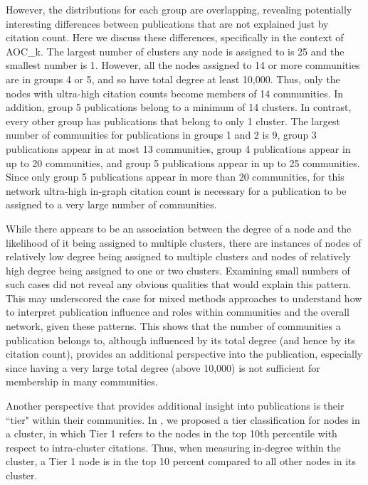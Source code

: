 \documentclass[12pt, oneside]{article}   	%
\begin{document}
	However, the distributions for each group are overlapping, revealing potentially interesting differences between publications that are not
	explained just by citation count. 
	Here we discuss these differences, specifically in the context of AOC\_k. 
	The largest number of clusters any node is assigned to is 25 and the smallest number is 1.
	However, all the nodes assigned to 14 or more communities are in groups 4 or 5, and so have total degree at least 10,000.
	Thus,  only the nodes with ultra-high citation counts become members of 14 communities.
	In addition, group 5 publications belong to a minimum of 14 clusters.  
	In contrast, every other group has publications that belong to only 1 cluster. 
	The largest number of communities for publications in groups 1 and 2 is  9,  
	group 3 publications appear in at most 13 communities, 
	group 4 publications appear in up to 20 communities, 
	and group 5 publications appear in up to 25 communities. 
	Since only group 5 publications appear in more than 20 communities, for this network ultra-high in-graph citation count is  necessary  for a publication to be assigned to a very large number of communities.  
	
	While there appears to be an association between the degree of a node and the likelihood of it being assigned to multiple clusters, there are instances of nodes of relatively low degree being assigned to multiple clusters and nodes of relatively high degree being assigned to one or two clusters. Examining small numbers of such cases did not reveal any obvious qualities that would explain this pattern. This may underscored the case for mixed methods approaches to understand how to interpret publication influence and roles within communities and the overall network, given these patterns. This shows that  the number of communities a publication belongs to, although influenced by its total degree (and hence by its citation count), provides an additional perspective into the publication, especially since having a very large total degree (above 10,000) is not sufficient  for membership in many communities. 
	
Another perspective that provides additional insight into publications is their ``tier" within their communities. In \cite{Chandrasekharan2021}, we  proposed a tier classification for nodes in a cluster, in which Tier 1 refers to the nodes in the top 10th percentile with respect to intra-cluster citations. Thus, when measuring in-degree within the cluster, a Tier 1 node is in the top 10 percent compared to all other nodes in its cluster. 
\end{document}

